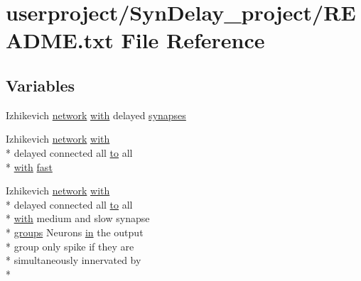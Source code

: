 \hypertarget{userproject_2SynDelay__project_2README_8txt}{\section{userproject/\+Syn\+Delay\+\_\+project/\+R\+E\+A\+D\+M\+E.txt File Reference}
\label{userproject_2SynDelay__project_2README_8txt}
}
\subsection*{Variables}
\begin{DoxyCompactItemize}
\item 
Izhikevich \hyperlink{userproject_2Izh__sparse__project_2README_8txt_a3b32176ef4eb1068d5341ffeb475ff7d}{network} \hyperlink{userproject_2OneComp__project_2README_8txt_ace09bb40fbf4457ad9a9340a67a4fa9a}{with} delayed \hyperlink{userproject_2SynDelay__project_2README_8txt_a7ef8cfd0b18b59bc74f8817d93fc159f}{synapses}
\item 
Izhikevich \hyperlink{userproject_2Izh__sparse__project_2README_8txt_a3b32176ef4eb1068d5341ffeb475ff7d}{network} \hyperlink{userproject_2OneComp__project_2README_8txt_ace09bb40fbf4457ad9a9340a67a4fa9a}{with} \\*
delayed connected all \hyperlink{README_8txt_add1f2ee32acc15ef77f839d4382c9768}{to} all \\*
\hyperlink{userproject_2OneComp__project_2README_8txt_ace09bb40fbf4457ad9a9340a67a4fa9a}{with} \hyperlink{userproject_2SynDelay__project_2README_8txt_a840f37532f55f9578b62c562cf737636}{fast}
\item 
Izhikevich \hyperlink{userproject_2Izh__sparse__project_2README_8txt_a3b32176ef4eb1068d5341ffeb475ff7d}{network} \hyperlink{userproject_2OneComp__project_2README_8txt_ace09bb40fbf4457ad9a9340a67a4fa9a}{with} \\*
delayed connected all \hyperlink{README_8txt_add1f2ee32acc15ef77f839d4382c9768}{to} all \\*
\hyperlink{userproject_2OneComp__project_2README_8txt_ace09bb40fbf4457ad9a9340a67a4fa9a}{with} medium and slow synapse \\*
\hyperlink{README_8txt_a7517205ac314873d8c5358b4a4e6eb79}{groups} Neurons \hyperlink{README_8txt_a148897a6b2cc9cff25af80abb13426b0}{in} the output \\*
group only spike if they are \\*
simultaneously innervated by \\*

\end{DoxyCompactItemize}
